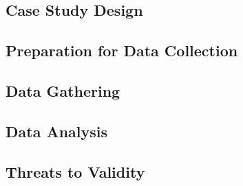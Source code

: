 \documentclass[10pt,twocolumn]{article}
\begin{document}
\subsection{Case Study Design}


\subsection{Preparation for Data Collection}

\subsection{Data Gathering}

\subsection{Data Analysis}

\subsection{Threats to Validity}








\noindent
\end{document}
